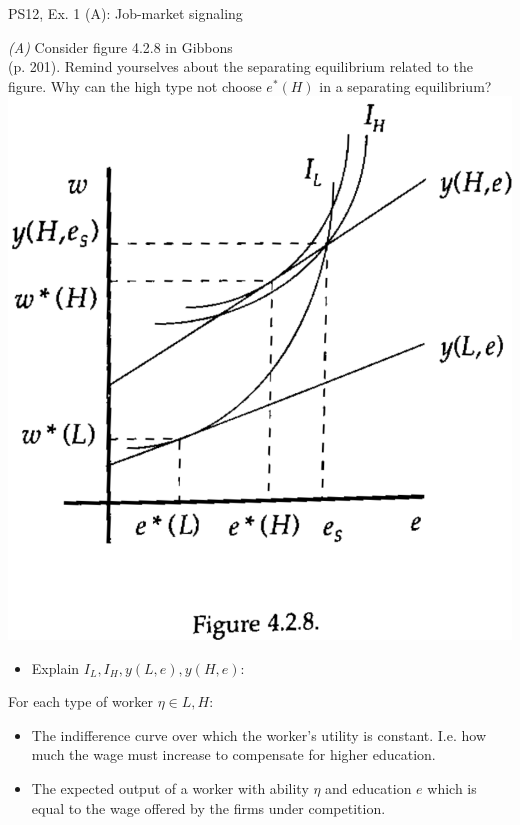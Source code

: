 \begin{frame}{PS12, Ex. 1 (A): Job-market signaling}
    \begin{multicols}{2}
      \textit{(A)} Consider figure 4.2.8 in Gibbons\\
      (p. 201). Remind yourselves about the separating equilibrium related to the figure. Why can the high type not choose $e^*(H)$ in a separating equilibrium?\vspace{8pt}
      \includegraphics[width=\columnwidth]{figures/Gibbons428}
      \vfill\null\columnbreak
      \begin{itemize}
        \item[Step 1:] Explain $I_L,I_H,y(L,e),y(H,e)$:
      \end{itemize}\vspace{-6pt}
      For each type of worker $\eta\in L,H$:\vspace{-6pt}
      \begin{itemize}
        \item[$I_\eta$:] The indifference curve over which the worker's utility is constant.
        I.e. how much the wage must increase to compensate for higher education.
        \item[$y(\eta,e)$:] \vspace{-2pt} The expected output of a worker with ability $\eta$ and education $e$ which is equal to the wage offered by the firms under competition.\\

\end{itemize}
\end{multicols}
\end{frame}
